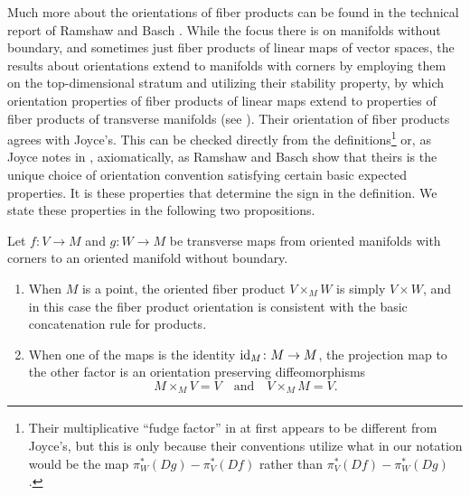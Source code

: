 Much more about the orientations of fiber products can be found in the technical report of Ramshaw and Basch \cite{RamBas09}.
While the focus there is on manifolds without boundary, and sometimes just fiber products of linear maps of vector spaces, the results about orientations extend to manifolds with corners by employing them on the top-dimensional stratum and utilizing their stability property, by which orientation properties of fiber products of linear maps extend to properties of fiber products of transverse manifolds (see \cite[Sections 6.3, 9.1.2, and 9.3]{RamBas09}).
Their orientation of fiber products agrees with Joyce's.
This can be checked directly from the definitions\footnote{Their multiplicative ``fudge factor'' in \cite[Theorem 9.14]{RamBas09} at first appears to be different from Joyce's, but this is only because their conventions utilize what in our notation would be the map $\pi_W^*(Dg)-\pi_V^*(Df)$ rather than $\pi_V^*(Df)-\pi_W^*(Dg)$.} or, as Joyce notes in \cite[Remark 7.6.iii]{Joy12}, axiomatically, as Ramshaw and Basch show that theirs is the unique choice of orientation convention satisfying certain basic expected properties.
It is these properties that determine the sign in the definition.
We state these properties in the following two propositions.

\begin{proposition}\label{P: oriented fiber product basic properties}
	Let $f \colon V \to M$ and $g \colon W \to M$ be transverse maps from oriented manifolds with corners to an oriented manifold without boundary.
	\begin{enumerate}
		\item When $M$ is a point, the oriented fiber product $V \times_M W$ is simply $V \times W$, and in this case the fiber product orientation is consistent with the basic concatenation rule for products.
		\item When one of the maps is the identity $\mathrm{id}_M \colon M \to M$, the projection map to the other factor is an orientation preserving diffeomorphisms
		\begin{equation*}
			M \times_M V = V\quad\text{and}\quad V \times_M M = V.
		\end{equation*}
	\end{enumerate}
\end{proposition}

